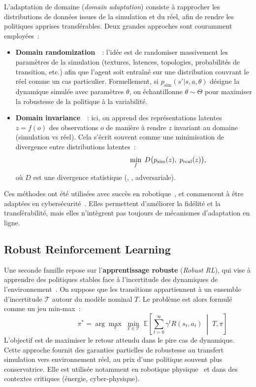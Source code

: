 \noindent
L'adaptation de domaine (\textit{domain adaptation}) consiste à rapprocher
les distributions de données issues de la simulation et du réel,
afin de rendre les politiques apprises transférables.
Deux grandes approches sont couramment employées~:

\begin{itemize}
  \item \textbf{Domain randomization}~\cite{tobin2017domain}~: l'idée est de
        randomiser massivement les paramètres de la simulation (textures, latences, topologies,
        probabilités de transition, etc.) afin que l'agent soit entraîné sur une distribution
        couvrant le réel comme un cas particulier. Formellement, si
        $p_\text{sim}(s'|s,a,\theta)$ désigne la dynamique simulée
        avec paramètres $\theta$, on échantillonne $\theta \sim \Theta$ pour
        maximiser la robustesse de la politique à la variabilité.
  \item \textbf{Domain invariance}~\cite{ganin2016domain}~: ici, on apprend
        des représentations latentes $z = f(o)$ des observations $o$
        de manière à rendre $z$ invariant au domaine
        (simulation vs réel). Cela s'écrit souvent comme une minimisation
        de divergence entre distributions latentes~:
        \[
          \hspace{3.5cm}\min_f \; D\big(p_\text{sim}(z), \; p_\text{real}(z)\big),
        \]
        où $D$ est une divergence statistique (, , adversariale).
\end{itemize}

\noindent
Ces méthodes ont été utilisées avec succès en robotique~\cite{tobin2017domain, peng2018sim},
et commencent à être adaptées en cybersécurité~\cite{Standen2021}.
Elles permettent d'améliorer la fidélité et la transférabilité,
mais elles n'intègrent pas toujours de mécanismes d'adaptation en ligne.

\subsection{Robust Reinforcement Learning}

\noindent
Une seconde famille repose sur l'\textbf{apprentissage robuste}
(\textit{Robust RL}), qui vise à apprendre des politiques stables
face à l'incertitude des dynamiques de l'environnement~\cite{pinto2017robust}.
On suppose que les transitions appartiennent à un ensemble d'incertitude
$\mathcal{T}$ autour du modèle nominal $T$.
Le problème est alors formulé comme un jeu min-max~:
\[
  \hspace{3cm}\pi^* = \arg\max_\pi \; \min_{T \in \mathcal{T}}
  \; \mathbb{E}\!\left[\sum_{t=0}^\infty \gamma^t R(s_t,a_t) \;\middle|\; T, \pi\right]
\]
L'objectif est de maximiser le retour attendu
dans le pire cas de dynamique.
Cette approche fournit des garanties partielles de robustesse
au transfert simulation vers environnement réel,
au prix d'une politique souvent plus conservatrice.
Elle est utilisée notamment en robotique physique~\cite{pinto2017robust}
et dans des contextes critiques (énergie, cyber-physique).

